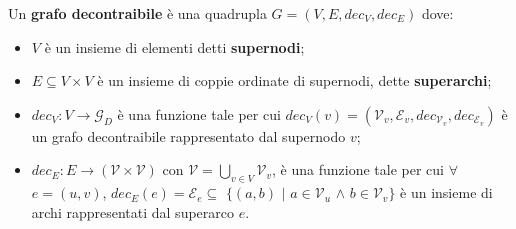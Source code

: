 \begin{minipage}[t]{\textwidth}
    {\tiny
    \begin{definizione}
    Un \textbf{grafo decontraibile} \`e una quadrupla $G = (V, E, dec_V, dec_E)$ dove:
    \begin{itemize}
        \item $V$ \`e un insieme di elementi detti \textbf{supernodi};
        \item $E \subseteq V \times V$ \`e un insieme di coppie ordinate di supernodi, dette \textbf{superarchi};
        \item $dec_V : V \rightarrow \mathcal{G}_D$ \`e una funzione tale per cui $dec_V(v) = (\mathcal{V}_v,
            \mathcal{E}_v, dec_{\mathcal{V}_v}, dec_{\mathcal{E}_v})$ \`e un grafo decontraibile rappresentato
            dal supernodo $v$;
        \item $dec_E : E \rightarrow (\mathcal{V} \times \mathcal{V})$ con $\mathcal{V} = \bigcup_{v \in V}\mathcal{V}_v$,
            \`e una funzione tale per cui $\forall$ $ e = (u, v)$, $dec_E(e) = \mathcal{E}_e \subseteq$ $\{(a, b)$ $\mid$ $a \in \mathcal{V}_u$ $\wedge$
            $b \in \mathcal{V}_v\}$ \`e un insieme di archi rappresentati dal superarco $e$.
    \end{itemize}
    \end{definizione}}
\end{minipage}